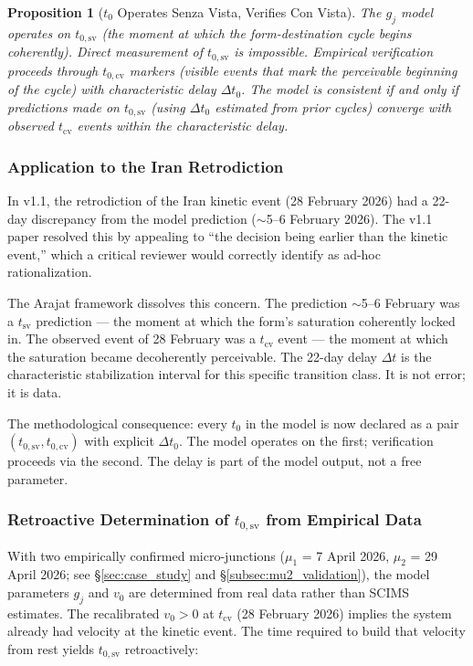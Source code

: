 \documentclass[12pt,a4paper]{article}
\newtheorem{proposition}{Proposition}[section]
\newcommand{\gj}{g_j}
\begin{document}
\begin{proposition}[$t_0$ Operates Senza Vista, Verifies Con Vista]\label{prop:t0_arajat}
The $\gj$ model operates on $t_{0,\mathrm{sv}}$ (the moment at which the form-destination cycle begins coherently). Direct measurement of $t_{0,\mathrm{sv}}$ is impossible. Empirical verification proceeds through $t_{0,\mathrm{cv}}$ markers (visible events that mark the perceivable beginning of the cycle) with characteristic delay $\Delta t_0$. The model is consistent if and only if predictions made on $t_{0,\mathrm{sv}}$ (using $\Delta t_0$ estimated from prior cycles) converge with observed $t_{\mathrm{cv}}$ events within the characteristic delay.
\end{proposition}

\subsubsection{Application to the Iran Retrodiction}

In v1.1, the retrodiction of the Iran kinetic event (28 February 2026) had a 22-day discrepancy from the model prediction ($\sim$5--6 February 2026). The v1.1 paper resolved this by appealing to ``the decision being earlier than the kinetic event,'' which a critical reviewer would correctly identify as ad-hoc rationalization.

The Arajat framework dissolves this concern. The prediction $\sim$5--6 February was a $t_{\mathrm{sv}}$ prediction --- the moment at which the form's saturation coherently locked in. The observed event of 28 February was a $t_{\mathrm{cv}}$ event --- the moment at which the saturation became decoherently perceivable. The 22-day delay $\Delta t$ is the characteristic stabilization interval for this specific transition class. It is not error; it is data.

The methodological consequence: every $t_0$ in the model is now declared as a pair $(t_{0,\mathrm{sv}}, t_{0,\mathrm{cv}})$ with explicit $\Delta t_0$. The model operates on the first; verification proceeds via the second. The delay is part of the model output, not a free parameter.

\subsubsection{Retroactive Determination of $t_{0,\mathrm{sv}}$ from Empirical Data}\label{subsubsec:t0_retro}

With two empirically confirmed micro-junctions ($\mu_1$ = 7 April 2026, $\mu_2$ = 29 April 2026; see \S\ref{sec:case_study} and \S\ref{subsec:mu2_validation}), the model parameters $\gj$ and $v_0$ are determined from real data rather than SCIMS estimates. The recalibrated $v_0 > 0$ at $t_{\mathrm{cv}}$ (28 February 2026) implies the system already had velocity at the kinetic event. The time required to build that velocity from rest yields $t_{0,\mathrm{sv}}$ retroactively:
\end{document}
